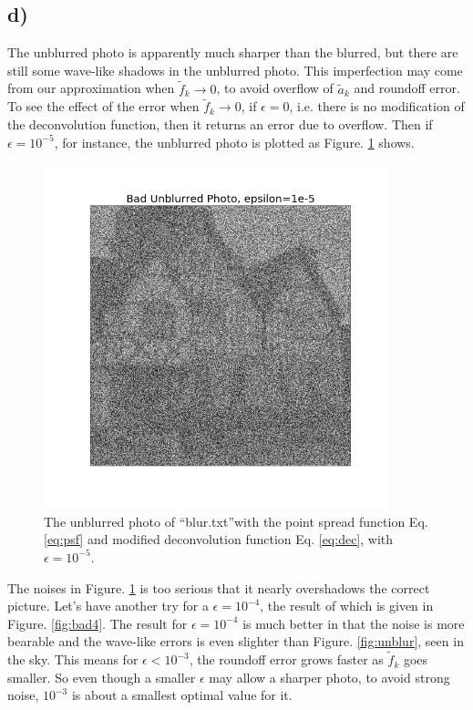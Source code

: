 \documentclass[12pt, graphicx]{article}
\begin{document}
\subsection*{d)}
The unblurred photo is apparently much sharper than the blurred, but there are still some wave-like shadows in the unblurred photo. This imperfection may come from our approximation when $\tilde{f}_k\to0$, to avoid overflow of $\tilde{a}_k$ and roundoff error. To see the effect of the error when $\tilde{f}_k\to0$, if $\epsilon=0$, i.e. there is no modification of the deconvolution function, then it returns an error due to overflow. Then if $\epsilon=10^{-5}$, for instance, the unblurred photo is plotted as Figure. \ref{fig:badunblur} shows. 

\begin{figure}[ht]
\centering
\includegraphics[width = 100mm]{bad_unblurred.png}
\caption{The unblurred photo of \textquotedblleft blur.txt\textquotedblright with the point spread function Eq. \ref{eq:psf} and modified deconvolution function Eq. \ref{eq:dec}, with $\epsilon=10^{-5}$.}
\label{fig:badunblur}
\end{figure}

The noises in Figure. \ref{fig:badunblur} is too serious that it nearly overshadows the correct picture. Let's have another try for a $\epsilon=10^{-4}$, the result of which is given in Figure. \ref{fig:bad4}. The result for $\epsilon=10^{-4}$ is much better in that the noise is more bearable and the wave-like errors is even slighter than Figure. \ref{fig:unblur}, seen in the sky. This means for $\epsilon<10^{-3}$, the roundoff error grows faster as $\tilde{f}_k$ goes smaller. So even though a smaller $\epsilon$ may allow a sharper photo, to avoid strong noise, $10^{-3}$ is about a smallest optimal value for it. 
\end{document}
